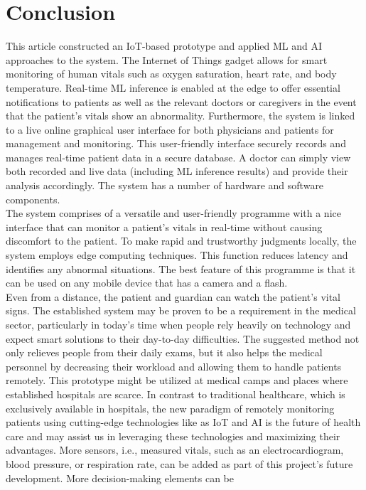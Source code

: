\documentclass{bmcart}
\begin{document}
\section*{Conclusion}
This article constructed an IoT-based prototype and applied ML and AI approaches
to the system. The Internet of Things gadget allows for smart monitoring of
human vitals such as oxygen saturation, heart rate, and body temperature.
Real-time ML inference is enabled at the edge to offer essential notifications
to patients as well as the relevant doctors or caregivers in the event that the
patient's vitals show an abnormality. Furthermore, the system is linked to a
live online graphical user interface for both physicians and patients for
management and monitoring. This user-friendly interface securely records and
manages real-time patient data in a secure database. A doctor can simply view
both recorded and live data (including ML inference results) and provide their
analysis accordingly. The system has a number of hardware and software
components.\\
The system comprises of a versatile and user-friendly programme with a nice
interface that can monitor a patient's vitals in real-time without causing
discomfort to the patient. To make rapid and trustworthy judgments locally, the
system employs edge computing techniques. This function reduces latency and
identifies any abnormal situations. The best feature of this programme is that
it can be used on any mobile device that has a camera and a flash.\\
Even from a distance, the patient and guardian can watch the patient's vital
signs. The established system may be proven to be a requirement in the medical
sector, particularly in today's time when people rely heavily on technology and
expect smart solutions to their day-to-day difficulties. The suggested method
not only relieves people from their daily exams, but it also helps the medical
personnel by decreasing their workload and allowing them to handle patients
remotely. This prototype might be utilized at medical camps and places where
established hospitals are scarce. In contrast to traditional healthcare, which
is exclusively available in hospitals, the new paradigm of remotely monitoring
patients using cutting-edge technologies like as IoT and AI is the future of
health care and may assist us in leveraging these technologies and maximizing
their advantages. More sensors, i.e., measured vitals, such as an
electrocardiogram, blood pressure, or respiration rate, can be added as part of
this project's future development. More decision-making elements can be
\end{document}
